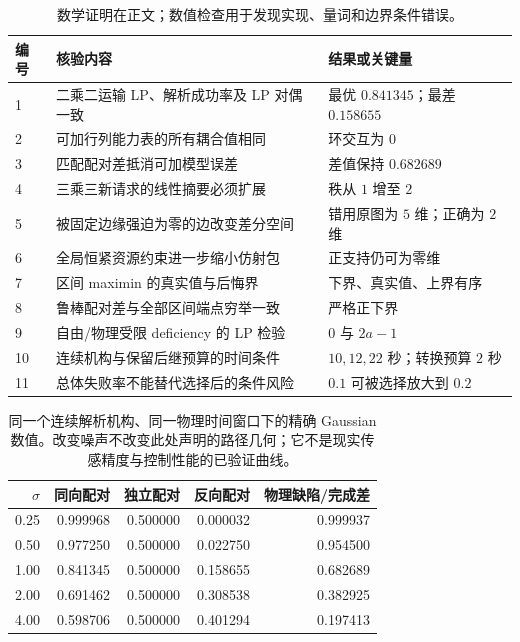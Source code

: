 \documentclass[UTF8,11pt,a4paper,fontset=fandol]{ctexart}
\numberwithin{equation}{section}
\theoremstyle{definition}
\begin{document}
\begin{table}[htbp]\centering\small
\begin{tabularx}{\linewidth}{P{9mm}Y P{32mm}}
\toprule
编号 & 核验内容 & 结果或关键量\\ & 二乘二运输 LP、解析成功率及 LP 对偶一致 & 最优 $0.841345$；最差 $0.158655$\\
2 & 可加行列能力表的所有耦合值相同 & 环交互为 $0$\\
3 & 匹配配对差抵消可加模型误差 & 差值保持 $0.682689$\\
4 & 三乘三新请求的线性摘要必须扩展 & 秩从 $1$ 增至 $2$\\
5 & 被固定边缘强迫为零的边改变差分空间 & 错用原图为 $5$ 维；正确为 $2$ 维\\
6 & 全局恒紧资源约束进一步缩小仿射包 & 正支持仍可为零维\\
7 & 区间 maximin 的真实值与后悔界 & 下界、真实值、上界有序\\
8 & 鲁棒配对差与全部区间端点穷举一致 & 严格正下界\\
9 & 自由/物理受限 deficiency 的 LP 检验 & $0$ 与 $2a-1$\\
10 & 连续机构与保留后继预算的时间条件 & $10,12,22$ 秒；转换预算 $2$ 秒\\
11 & 总体失败率不能替代选择后的条件风险 & $0.1$ 可被选择放大到 $0.2$\\
\bottomrule
\end{tabularx}
\caption{数学证明在正文；数值检查用于发现实现、量词和边界条件错误。}
\end{table}

\begin{table}[htbp]\centering\small
\begin{tabular}{rrrrr}\toprule
$\sigma$ & 同向配对 & 独立配对 & 反向配对 & 物理缺陷/完成差\\\midrule
0.25 & 0.999968 & 0.500000 & 0.000032 & 0.999937\\
0.50 & 0.977250 & 0.500000 & 0.022750 & 0.954500\\
1.00 & 0.841345 & 0.500000 & 0.158655 & 0.682689\\
2.00 & 0.691462 & 0.500000 & 0.308538 & 0.382925\\
4.00 & 0.598706 & 0.500000 & 0.401294 & 0.197413\\\bottomrule
\end{tabular}
\caption{同一个连续解析机构、同一物理时间窗口下的精确 Gaussian 数值。改变噪声不改变此处声明的路径几何；它不是现实传感精度与控制性能的已验证曲线。}
\end{table}
\end{document}
